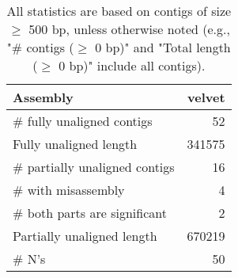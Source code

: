\documentclass[12pt,a4paper]{article}
\begin{document}
\begin{table}[ht]
\begin{center}
\caption{All statistics are based on contigs of size $\geq$ 500 bp, unless otherwise noted (e.g., "\# contigs ($\geq$ 0 bp)" and "Total length ($\geq$ 0 bp)" include all contigs).}
\begin{tabular}{|l*{1}{|r}|}
\hline
Assembly & velvet \\ \hline
\# fully unaligned contigs & 52 \\ \hline
Fully unaligned length & 341575 \\ \hline
\# partially unaligned contigs & 16 \\ \hline
\hspace{5mm}\# with misassembly & 4 \\ \hline
\hspace{5mm}\# both parts are significant & 2 \\ \hline
Partially unaligned length & 670219 \\ \hline
\# N's & 50 \\ \hline
\end{tabular}
\end{center}
\end{table}
\end{document}
